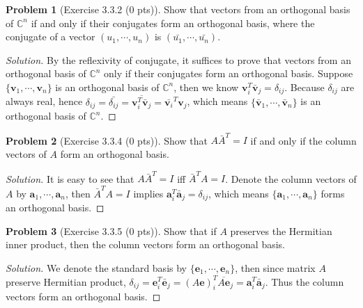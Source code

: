 \documentclass{article}
\theoremstyle{definition}
\newtheorem{problem}{Problem}
\theoremstyle{plain}
\begin{document}
\begin{problem}[Exercise 3.3.2 (0 pts)]Show that vectors from an orthogonal basis of $\mathbb{C}^n$ if and only if their conjugates form an orthogonal basis, where the conjugate of a vector $(u_1,\cdots,u_n)$ is $(\bar{u_1},\cdots,\bar{u_n})$.
\end{problem}
\begin{adjustwidth}{0.7cm}{}
\color{blue}
\begin{proof}[Solution]By the reflexivity of conjugate, it suffices to prove that vectors from an orthogonal basis of $\mathbb{C}^n$ only if their conjugates form an orthogonal basis. Suppose $\{\bm{v}_1,\cdots,\bm{v}_n\}$ is an orthogonal basis of $\mathbb{C}^n$, then we know $\bm{v}_i^T\bar{\bm{v}}_j=\delta_{ij}$. Because $\delta_{ij}$ are always real, hence $\delta_{ij}=\bar{\delta_{ij}}=\overline{\bm{v}_i^T\bar{\bm{v}}_j}=\bar{\bm{v}_i}^T\bm{v}_j$, which means $\{\bar{\bm{v}}_1,\cdots,\bar{\bm{v}}_n\}$ is an orthogonal basis of $\mathbb{C}^n$.
\color{black}
\end{proof}
\end{adjustwidth}

\begin{problem}[Exercise 3.3.4 (0 pts)]Show that $A\bar{A}^T=I$ if and only if the column vectors of $A$ form an orthogonal basis.
\end{problem}
\begin{adjustwidth}{0.7cm}{}
\color{blue}
\begin{proof}[Solution]It is easy to see that $A\bar{A}^T=I$ iff $\bar{A}^TA=I$. Denote the column vectors of $A$ by $\bm{a}_1,\cdots,\bm{a}_n$, then $\bar{A}^TA=I$ implies $\bm{a}_i^T\bar{\bm{a}}_j=\delta_{ij}$, which means $\{\bm{a}_1,\cdots,\bm{a}_n\}$ forms an orthogonal basis.
\color{black}
\end{proof}
\end{adjustwidth}

\begin{problem}[Exercise 3.3.5 (0 pts)]Show that if $A$ preserves the Hermitian inner product, then the column vectors form an orthogonal basis.
\end{problem}
\begin{adjustwidth}{0.7cm}{}
\color{blue}
\begin{proof}[Solution]We denote the standard basis by $\{\bm{e}_1,\cdots,\bm{e}_n\}$, then since matrix $A$ preserve Hermitian product, $\delta_{ij}=\bm{e}_i^T\bar{\bm{e}}_j=(A\bm{e})_i^T\overline{A\bm{e}}_j=\bm{a}_i^T\bar{\bm{a}}_j$. Thus the column vectors form an orthogonal basis.
\color{black}
\end{proof}
\end{adjustwidth}
\end{document}
